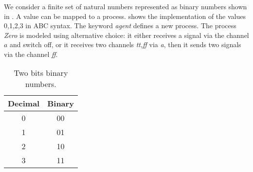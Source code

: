 We consider a finite set of natural numbers represented as binary numbers shown in . A value can be mapped to a \picalc{} process.  shows the \picalc{} implementation of the values 0,1,2,3 in ABC syntax. The keyword \textit{agent} defines a new process. The process \textit{Zero} is modeled using alternative choice: it either receives a signal via the channel $a$ and switch off, or it receives two channels \textit{tt,ff} via \textit{a}, then it sends two signals via the channel \textit{ff}.
\begin{table}[H]
\centering
\begin{tabular}{|c|c|}
\hline
Decimal & Binary \\ \hline
0       & 00     \\ \hline
1       & 01     \\ \hline
2       & 10     \\ \hline
3       & 11     \\ \hline
\end{tabular}%
\caption{Two bits binary numbers.}
\label{two_bit_binary_numbers}
\end{table}

